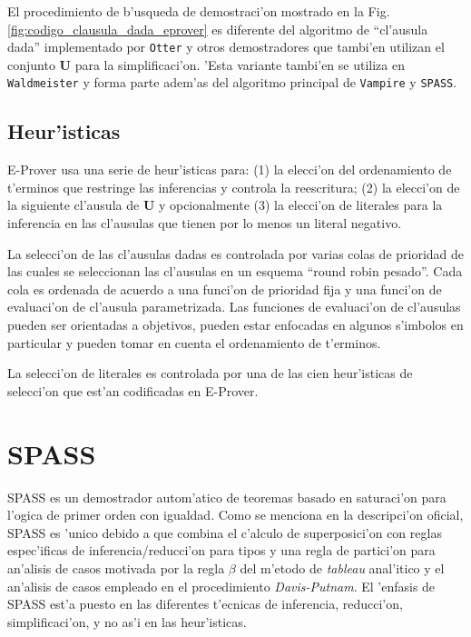 El procedimiento de b'usqueda de demostraci'on mostrado en la Fig. \ref{fig:codigo_clausula_dada_eprover} es diferente del algoritmo de ``cl'ausula dada'' implementado por \texttt{Otter}\cite{otter} y otros demostradores que tambi'en utilizan el conjunto \textbf{U} para la simplificaci'on. 'Esta variante tambi'en se utiliza en \texttt{Waldmeister}\cite{BH96} y forma parte adem'as del algoritmo principal de \texttt{Vampire} \cite{vampire} y \texttt{SPASS}\cite{spass}.

\subsection{Heur'isticas}

E-Prover usa una serie de heur'isticas para: (1) la elecci'on del ordenamiento de t'erminos que restringe las inferencias y controla la reescritura; (2) la elecci'on de la siguiente cl'ausula de \textbf{U} y opcionalmente (3) la elecci'on de literales para la inferencia en las cl'ausulas que tienen por lo menos un literal negativo.

La selecci'on de las cl'ausulas dadas es controlada por varias colas de prioridad de las cuales se seleccionan las cl'ausulas en un esquema ``round robin pesado''. Cada cola es ordenada de acuerdo a una funci'on de prioridad fija y una funci'on de evaluaci'on de cl'ausula parametrizada. Las funciones de evaluaci'on de cl'ausulas pueden ser orientadas a objetivos, pueden estar enfocadas en algunos s'imbolos en particular y pueden tomar en cuenta el ordenamiento de t'erminos. 


La selecci'on de literales es controlada por una de las cien heur'isticas de selecci'on que est'an codificadas en E-Prover.



\section{SPASS}

SPASS es un demostrador autom'atico de teoremas basado en saturaci'on para l'ogica de primer orden con igualdad. Como se menciona en la descripci'on oficial, SPASS es 'unico debido a que combina el c'alculo de superposici'on con reglas espec'ificas de inferencia/reducci'on para tipos y una regla de partici'on para an'alisis de casos motivada por la regla $\beta$ del m'etodo de \textit{tableau} anal'itico y el an'alisis de casos empleado en el procedimiento \textit{Davis-Putnam}. El 'enfasis de SPASS est'a puesto en las diferentes t'ecnicas de inferencia, reducci'on, simplificaci'on, y no as'i en las heur'isticas.


